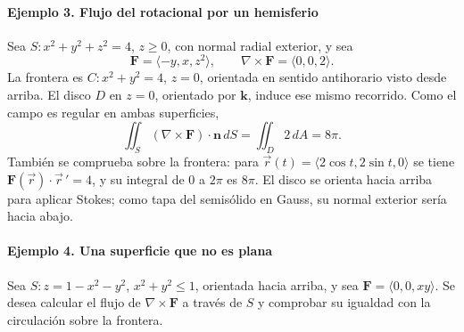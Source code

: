 \paragraph{Ejemplo 3. Flujo del rotacional por un hemisferio}
Sea $S:x^2+y^2+z^2=4$, $z\geq0$, con normal radial exterior, y sea
\[
\mathbf F=\langle-y,x,z^2\rangle,
\qquad \nabla\times\mathbf F=\langle0,0,2\rangle.
\]
La frontera es $C:x^2+y^2=4$, $z=0$, orientada en sentido antihorario visto desde arriba. El disco $D$ en $z=0$, orientado por $\mathbf k$, induce ese mismo recorrido. Como el campo es regular en ambas superficies,
\[
\iint_S(\nabla\times\mathbf F)\cdot\mathbf n\,dS
=\iint_D2\,dA=8\pi.
\]
También se comprueba sobre la frontera: para $\vec r(t)=\langle2\cos t,2\sin t,0\rangle$ se tiene $\mathbf F(\vec r)\cdot\vec r\,'=4$, y su integral de $0$ a $2\pi$ es $8\pi$. El disco se orienta hacia arriba para aplicar Stokes; como tapa del semisólido en Gauss, su normal exterior sería hacia abajo.


\begin{center}
\begin{minipage}{.94\textwidth}
\centering
\begingroup\shorthandoff{>}
\endgroup
\end{minipage}
\end{center}

\paragraph{Ejemplo 4. Una superficie que no es plana}
Sea $S:z=1-x^2-y^2$, $x^2+y^2\leq1$, orientada hacia arriba, y sea $\mathbf F=\langle0,0,xy\rangle$. Se desea calcular el flujo de $\nabla\times\mathbf F$ a través de $S$ y comprobar su igualdad con la circulación sobre la frontera.

